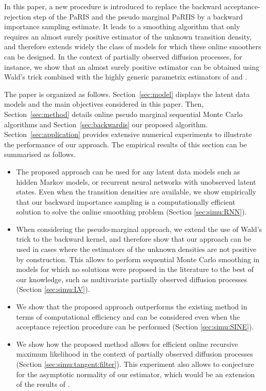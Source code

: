 \documentclass{article}
\begin{document}
In this paper, a new procedure is introduced to replace the backward acceptance-rejection step of the PaRIS and the pseudo marginal PaRIIS by a backward importance sampling estimate.  %
It leads to a smoothing algorithm that only requires an almost surely positive estimator of the unknown transition density, and therefore extends widely the class of models for which these online smoothers can be designed. 
In the context of partially observed diffusion processes, for instance,  we show that an almost surely positive estimator can be obtained using Wald's trick combined with the highly generic parametrix estimators of \cite{andersson2017unbiased} and \cite{fearnhead2017continuous}.

The paper is organized as follows. Section~\ref{sec:model} displays the latent data models and the main objectives considered in this paper. Then, Section~\ref{sec:method} details online pseudo marginal sequential Monte Carlo algorithms and Section~\ref{sec:backwardis} our proposed algorithm. Section~\ref{sec:application}  provides  extensive numerical experiments to illustrate the performance of our approach. The empirical results of this section can be summarised as follows.
\begin{itemize}
\item The proposed approach can be used for any latent data models such as hidden Markov models, or recurrent neural networks with unobserved latent states. Even when the transition densities are available, we show empirically that our backward importance sampling is a computationally efficient solution to solve the online smoothing problem (Section \ref{sec:simu:RNN}).
\item When considering the pseudo-marginal approach, we extend the use of Wald's trick to the backward kernel, and therefore show that our approach can be used in cases where the estimators of the unknown densities  are not positive by construction. This allows to perform sequential Monte Carlo smoothing in models for which no solutions were proposed in the literature to the best of our knowledge, such as multivariate partially observed diffusion processes (Section \ref{sec:simu:LV}).
\item We show that the proposed approach outperforms the existing method in terms of computational efficiency and can be considered even when the acceptance rejection procedure can be performed (Section \ref{sec:simu:SINE}). 
\item We show how the proposed method allows for efficient online recursive maximum likelihood in the context of partially observed diffusion processes (Section \ref{sec:simu:tangent:filter}). This experiment also allows to conjecture for the asymptotic normality of our estimator, which would be an extension of the results of \cite{gloaguen2021pseudo}.
\end{itemize}
\end{document}
